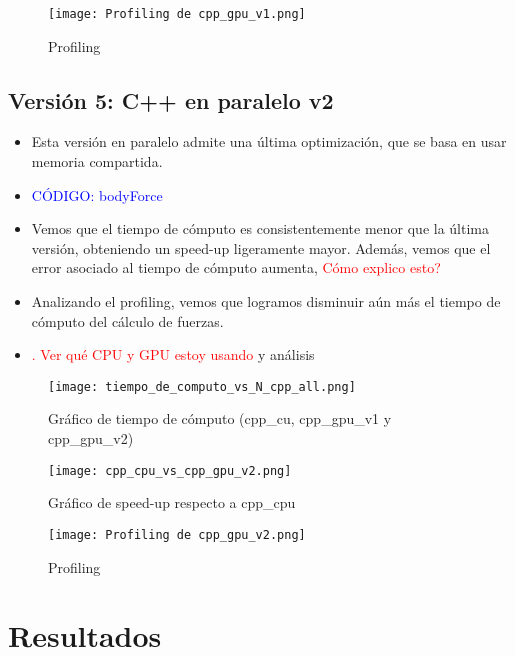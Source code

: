 \documentclass[aps,prb,twocolumn,superscriptaddress,floatfix,longbibliography]{revtex4-2}
\newcounter{para}
\begin{document}
\begin{itemize}
\begin{figure}[h]
    \texttt{[image: Profiling de cpp\_gpu\_v1.png]}
    \caption{Profiling}
     \label{fig:Profiling de cpp_gpu_v1}
\end{figure}




\subsection{Versión 5: C++ en paralelo v2}

\begin{itemize}
    \item Esta versión en paralelo admite una última optimización, que se basa en usar memoria compartida.
    \item \textcolor{blue}{CÓDIGO: bodyForce}
    \item Vemos que el tiempo de cómputo es consistentemente menor que la última versión, obteniendo un speed-up ligeramente mayor. Además, vemos que el error asociado al tiempo de cómputo aumenta, \textcolor{red}{Cómo explico esto?}
    \item Analizando el profiling, vemos que logramos disminuir aún más el tiempo de cómputo del cálculo de fuerzas.
    \item \textcolor{red}{. Ver qué CPU y GPU estoy usando} y análisis
\end{itemize}

\begin{figure}[h]
    \texttt{[image: tiempo\_de\_computo\_vs\_N\_cpp\_all.png]}
    \caption{Gráfico de tiempo de cómputo (cpp_cu, cpp_gpu_v1 y cpp_gpu_v2)}
     \label{fig:tiempo_de_computo_vs_N_cpp_all}
\end{figure}

\begin{figure}[h]
    \texttt{[image: cpp\_cpu\_vs\_cpp\_gpu\_v2.png]}
    \caption{Gráfico de speed-up respecto a cpp_cpu}
     \label{fig:cpp_cpu_vs_cpp_gpu_v2}
\end{figure}

\begin{figure}[h]
    \texttt{[image: Profiling de cpp\_gpu\_v2.png]}
    \caption{Profiling}
     \label{fig:Profiling de cpp_gpu_v2}
\end{figure}

\section{Resultados}


\end{itemize}
\end{document}
